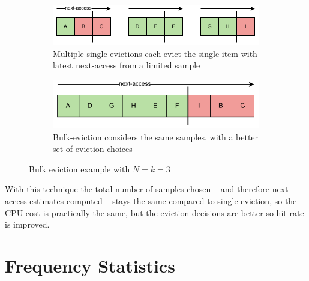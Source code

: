 \begin{figure}
    \centering
    \begin{subfigure}{\columnwidth}
        \centering
        \includegraphics[width=\columnwidth]{figures/Diagrams/diagrams-multi-eviction-a.pdf}
        \caption{Multiple single evictions each evict the single item with latest next-access from a limited sample}
    \end{subfigure}
    \vspace{5pt}
    \begin{subfigure}{\columnwidth}
        \centering
        \includegraphics[width=0.8181818\columnwidth]{figures/Diagrams/diagrams-multi-eviction-b.pdf}
        \caption{Bulk-eviction considers the same samples, with a better set of eviction choices}
    \end{subfigure}
    
    \caption{Bulk eviction example with $N=k=3$}
    \label{fig:multi-eviction}
\end{figure}

With this technique the total number of samples chosen -- and therefore next-access estimates computed -- stays the same compared to single-eviction, so the CPU cost is practically the same, but the eviction decisions are better so hit rate is improved.





\section{\label{sec:frequency-stats}Frequency Statistics}

